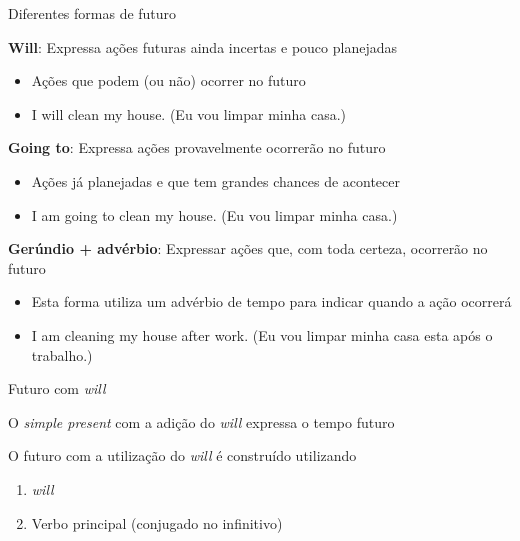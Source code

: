 \documentclass[compress,mathserif,xcolor=table]{beamer}
\begin{document}
\begin{frame}{Diferentes formas de futuro}

\textbf{Will}: Expressa ações futuras ainda incertas e pouco planejadas

\begin{itemize}
    \item Ações que podem (ou não) ocorrer no futuro
    \item I will clean my house. (Eu vou limpar minha casa.)
\end{itemize}

\vspace{0.15cm}

\textbf{Going to}: Expressa ações provavelmente ocorrerão no futuro
\begin{itemize}
    \item Ações já planejadas e que tem grandes chances de acontecer
    \item I am going to clean my house. (Eu vou limpar minha casa.)
\end{itemize}

\vspace{0.15cm}

\textbf{Gerúndio + advérbio}: Expressar ações que, com toda certeza, ocorrerão no futuro
\begin{itemize}
    \item Esta forma utiliza um advérbio de tempo para indicar quando a ação ocorrerá
    \item I am cleaning my house after work. (Eu vou limpar minha casa esta após o trabalho.)
\end{itemize}

\end{frame}




\begin{frame}{Futuro com \textit{will}}

O \textit{simple present} com a adição do \textit{will} expressa o tempo futuro

\vspace{0.5cm}

O futuro com a utilização do \textit{will} é construído utilizando
\begin{enumerate}
    \item \textit{will}
    \item Verbo principal (conjugado no infinitivo)
\end{enumerate}

\end{frame}
\end{document}

